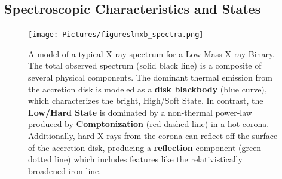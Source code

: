 \subsection{Spectroscopic Characteristics and States}

\begin{figure}[ht!]
    \centering
    \texttt{[image: Pictures/figureslmxb\_spectra.png]}
\caption{A model of a typical X-ray spectrum for a Low-Mass X-ray Binary. The total observed spectrum (solid black line) is a composite of several physical components. The dominant thermal emission from the accretion disk is modeled as a \textbf{disk blackbody} (blue curve), which characterizes the bright, High/Soft State. In contrast, the \textbf{Low/Hard State} is dominated by a non-thermal power-law produced by \textbf{Comptonization} (red dashed line) in a hot corona. Additionally, hard X-rays from the corona can reflect off the surface of the accretion disk, producing a \textbf{reflection} component (green dotted line) which includes features like the relativistically broadened iron line.}
\end{figure}

